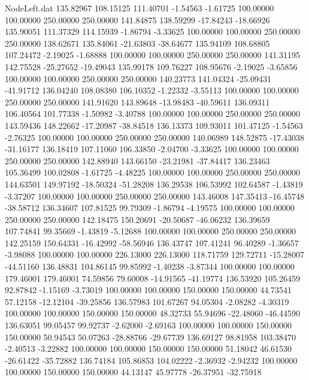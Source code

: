 \begin{filecontents}{NodeLeft.dat}
 135.82967  108.15125  111.40701    -1.54563   -1.61725  100.00000  100.00000  250.00000  250.00000  141.84875  138.59299  -17.84243  -18.66926
 135.90051  111.37329  114.15939    -1.86794   -3.33625  100.00000  100.00000  250.00000  250.00000  138.62671  135.84061  -21.63803  -38.64677
 135.94109  108.68805  107.24472    -2.19025   -1.68888  100.00000  100.00000  250.00000  250.00000  141.31195  142.75528  -25.27652  -19.49043
 135.99178  109.76227  108.95676    -2.19025   -3.65856  100.00000  100.00000  250.00000  250.00000  140.23773  141.04324  -25.09431  -41.91712
 136.04240  108.08380  106.10352    -1.22332   -3.55113  100.00000  100.00000  250.00000  250.00000  141.91620  143.89648  -13.98483  -40.59611
 136.09311  106.40564  101.77338    -1.50982   -3.40788  100.00000  100.00000  250.00000  250.00000  143.59436  148.22662  -17.20987  -38.84518
 136.13373  109.93011  101.47125    -1.54563   -2.76325  100.00000  100.00000  250.00000  250.00000  140.06989  148.52875  -17.43038  -31.16177
 136.18419  107.11060  106.33850    -2.04700   -3.33625  100.00000  100.00000  250.00000  250.00000  142.88940  143.66150  -23.21981  -37.84417
 136.23463  105.36499  100.02808    -1.61725   -4.48225  100.00000  100.00000  250.00000  250.00000  144.63501  149.97192  -18.50324  -51.28208
 136.29538  106.53992  102.64587    -1.43819   -3.37207  100.00000  100.00000  250.00000  250.00000  143.46008  147.35413  -16.45748  -38.58712
 136.34607  107.81525   99.79309    -1.86794   -4.19575  100.00000  100.00000  250.00000  250.00000  142.18475  150.20691  -20.50687  -46.06232
 136.39659  107.74841   99.35669    -1.43819   -5.12688  100.00000  100.00000  250.00000  250.00000  142.25159  150.64331  -16.42992  -58.56946
 136.43747  107.41241   96.40289    -1.36657   -3.98088  100.00000  100.00000  226.13000  226.13000  118.71759  129.72711  -15.28007  -44.51160
 136.48831  104.86145   99.85992    -1.40238   -3.87344  100.00000  100.00000  179.46001  179.46001   74.59856   79.60008  -14.91565  -41.19774
 136.53920  105.26459   92.87842    -1.15169   -3.73019  100.00000  100.00000  150.00000  150.00000   44.73541   57.12158  -12.12104  -39.25856
 136.57983  101.67267   94.05304    -2.08282   -4.30319  100.00000  100.00000  150.00000  150.00000   48.32733   55.94696  -22.48060  -46.44590
 136.63051   99.05457   99.92737    -2.62000   -2.69163  100.00000  100.00000  150.00000  150.00000   50.94543   50.07263  -28.88766  -29.67739
 136.69127   98.81958  103.38470    -2.40513   -3.22882  100.00000  100.00000  150.00000  150.00000   51.18042   46.61530  -26.61422  -35.72882
 136.74184  105.86853  104.02222    -2.36932   -2.94232  100.00000  100.00000  150.00000  150.00000   44.13147   45.97778  -26.37951  -32.75918

\end{filecontents}
